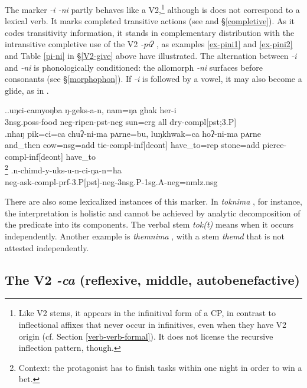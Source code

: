 The marker  \emph{-i \ti -ni}  partly behaves like a V2,\footnote{Like V2 stems, it appears in the infinitival form of a CP, in contrast to inflectional affixes that never occur in infinitives, even when they have V2 origin (cf. Section \ref{verb-verb-formal}). It does not license the recursive inflection pattern, though.} although is does  not  correspond to a lexical verb. It  marks  completed transitive actions (see \Next and §\ref{completive}). As it codes transitivity information, it stands in complementary distribution with the intransitive completive use of the V2 \emph{-piʔ} , as examples \ref{ex-pini1} and \ref{ex-pini2} and Table \ref{pi-ni} in  §\ref{V2-give} above have illustrated. The  alternation between \emph{-i} and \emph{-ni} is phonologically conditioned: the allomorph \emph{-ni} surfaces before consonants (see §\ref{morphophon}). If \emph{-i} is followed by a vowel, it may also become a glide, as in \Next[c].

\ex.\ag.uŋci-camyoŋba  ŋ-geks-a-n,   nam=ŋa   ghak her-i\\
{\sc 3nsg.poss-}food {\sc neg-}ripen{\sc [3sg]-pst-neg} sun{\sc =erg} all dry{\sc -compl[pst;3.P]}\\
\bg.nhaŋ     pik=ci=ca  chuʔ-ni-ma     pʌrne=bu,  luŋkhwak=ca  hoʔ-ni-ma     pʌrne\\
and\_then cow{\sc =nsg=add} tie{\sc -compl-inf[deont]} have\_to{\sc =rep}  stone{\sc =add}  pierce{\sc -compl-inf[deont]} have\_to\\
\footnote{Context: the protagonist has to finish tasks within one night in order to win a bet.} 
\bg.n-chimd-y-uks-u-n-ci-ŋa-n=ha\\
{\sc neg-}ask{\sc -compl-prf-3.P[pst]-neg-3nsg.P-1sg.A-neg=nmlz.nsg}\\

There are also some  lexicalized instances of this marker. In \emph{toknima} , for instance, the interpretation is holistic and cannot be achieved by analytic decomposition of the predicate into its components. The verbal stem \emph{tok(t)} means  when it occurs independently. Another example is \emph{themnima} , with a stem \emph{themd} that is not attested independently.


\subsection{The V2 \emph{-ca} (reflexive, middle, autobenefactive)}\label{V2-eat}%

